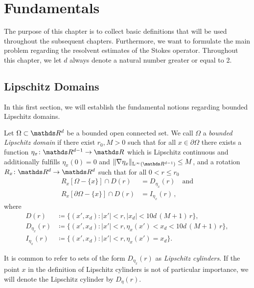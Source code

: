 \chapter{Fundamentals}
\label{chap:1}

The purpose of this chapter is to collect basic definitions that will be used throughout the subsequent chapters. Furthermore, we want to formulate the main problem regarding the resolvent estimates of the Stokes operator.
Throughout this chapter, we let $d$ always denote a natural number greater or equal to 2.

\section{Lipschitz Domains}

In this first section, we will establish the fundamental notions regarding bounded Lipschitz domains.

\begin{defn}
  \label{defn:lipschitzDomain}
  Let $\Omega \subset \R^d$ be a bounded open connected set.
  We call $\Omega$ a \emph{bounded Lipschitz domain} if there exist $r_0, M > 0$ such that for all $x \in \partial\Omega$ there exists a function $\eta_x \colon \R^{d - 1} \to \R$ which is Lipschitz continuous and additionally fulfills $\eta_x(0) = 0$ and $\|\nabla \eta_x \|_{\Ell^\infty(\R^{d - 1})} \leq M$, and a rotation $R_x \colon \R^d \to \R^d$ such that for all $0 < r \leq r_0$ 
  \begin{align*}
    R_x[ \Omega - \{x\} ] \cap D(r) &= D_{\eta_x}(r) \quad\text{and}\\[0.5em]
    R_x[\partial\Omega - \{x\}] \cap D(r) &= I_{\eta_x}(r)\,,
  \end{align*}
  where
  \begin{align*}
    D(r) &\coloneqq \big\{ (x', x_d) \colon |x'| < r, |x_d| < 10 d\, (M + 1)\, r\big\}, \\[0.5em]
    D_{\eta_x}(r) &\coloneqq \big\{ (x', x_d) \colon |x'| < r, \eta_x(x') < x_d < 10 d\,(M+ 1)\,r\big\}, \\[0.5em]
    I_{\eta_x}(r) &\coloneqq \big\{ (x', x_d) \colon |x'| < r, \eta_x(x') = x_d \big\} .
  \end{align*}
\end{defn}
  It is common to refer to sets of the form $D_{\eta_x}(r)$ as \emph{Lipschitz cylinders}. If the point $x$ in the definition of Lipschitz cylinders is not of particular importance, we will denote the Lipschitz cylinder by $D_{\eta}(r)$.

